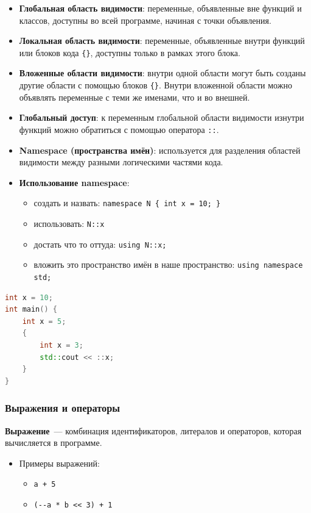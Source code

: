 \begin{itemize}
  \item \textbf{Глобальная область видимости}: переменные, объявленные вне функций и классов, доступны во всей программе, начиная с точки объявления.
  \item \textbf{Локальная область видимости}: переменные, объявленные внутри функций или блоков кода \verb|{}|, доступны только в рамках этого блока.
  \item \textbf{Вложенные области видимости}: внутри одной области могут быть созданы другие области с помощью блоков \verb|{}|. Внутри вложенной области можно объявлять переменные с теми же именами, что и во внешней.
  \item \textbf{Глобальный доступ}: к переменным глобальной области видимости изнутри функций можно обратиться с помощью оператора \verb|::|.
  \item \textbf{Namespace (пространства имён)}: используется для разделения областей видимости между разными логическими частями кода.
  \item \textbf{Использование namespace}:
    \begin{itemize}
        \item создать и назвать: \verb|namespace N { int x = 10; }|
        \item использовать: \verb|N::x|
        \item достать что то оттуда: \verb|using N::x;|
        \item вложить это пространство имён в наше пространство: \verb|using namespace std;|
    \end{itemize}
\end{itemize}

\begin{lstlisting}[language=C++]
int x = 10;
int main() {
    int x = 5;
    {
        int x = 3;
        std::cout << ::x;
    }
}
\end{lstlisting}

\subsubsection{Выражения и операторы}

\textbf{Выражение}~--- комбинация идентификаторов, литералов и операторов, которая вычисляется в программе.

\begin{itemize}
  \item Примеры выражений:
    \begin{itemize}
      \item \verb|a + 5|
      \item \verb|(--a * b << 3) + 1|
    \end{itemize}
\end{itemize}

